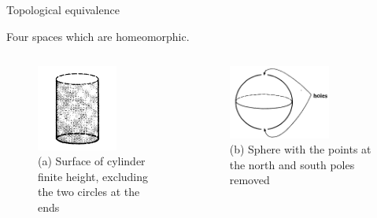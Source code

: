 \documentclass{beamer}
\begin{document}
\begin{frame}{Topological equivalence}
  \begin{block}{}
    Four spaces which are homeomorphic.
  \end{block}
  \begin{columns}
    \begin{column}{0.4\textwidth}
      \begin{figure}
        \centering
        \includegraphics[width=0.7\textwidth]{figure_1_9_a.png}
        \caption{(a) Surface of cylinder finite height, excluding the two circles at the ends}
      \end{figure}
    \end{column}
    \begin{column}{0.6\textwidth}
      \begin{figure}
        \centering
        \includegraphics[width=0.7\textwidth]{figure_1_9_d.png}
        \caption{(b) Sphere with the points at the north and south poles removed}
      \end{figure}
    \end{column}
  \end{columns}
\end{frame}
\end{document}
